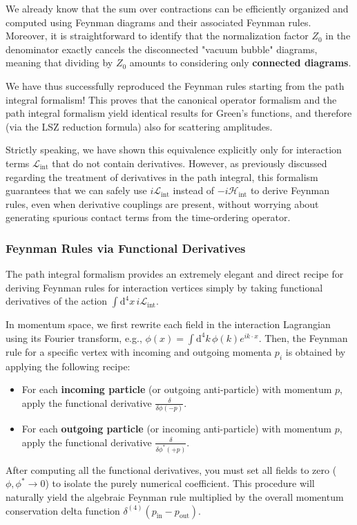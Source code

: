 We already know that the sum over contractions can be efficiently organized and computed using Feynman diagrams and their associated Feynman rules. Moreover, it is straightforward to identify that the normalization factor $Z_0$ in the denominator exactly cancels the disconnected "vacuum bubble" diagrams, meaning that dividing by $Z_0$ amounts to considering only \textbf{connected diagrams}.

We have thus successfully reproduced the Feynman rules starting from the path integral formalism! This proves that the canonical operator formalism and the path integral formalism yield identical results for Green's functions, and therefore (via the LSZ reduction formula) also for scattering amplitudes.

\begin{remark}
    Strictly speaking, we have shown this equivalence explicitly only for interaction terms $\mathcal{L}_{\text{int}}$ that do not contain derivatives. However, as previously discussed regarding the treatment of derivatives in the path integral, this formalism guarantees that we can safely use $i\mathcal{L}_{\text{int}}$ instead of $-i\mathcal{H}_{\text{int}}$ to derive Feynman rules, even when derivative couplings are present, without worrying about generating spurious contact terms from the time-ordering operator.
\end{remark}

\subsubsection{Feynman Rules via Functional Derivatives}

The path integral formalism provides an extremely elegant and direct recipe for deriving Feynman rules for interaction vertices simply by taking functional derivatives of the action $\int \mathrm{d}^4x \, i \mathcal{L}_{\text{int}}$.

In momentum space, we first rewrite each field in the interaction Lagrangian using its Fourier transform, e.g., $\phi(x) = \int \mathrm{d}^4k \, \phi(k) e^{ik \cdot x}$.
Then, the Feynman rule for a specific vertex with incoming and outgoing momenta $p_i$ is obtained by applying the following recipe:
\begin{itemize}
    \item For each \textbf{incoming particle} (or outgoing anti-particle) with momentum $p$, apply the functional derivative $\frac{\delta}{\delta \phi(-p)}$.
    \item For each \textbf{outgoing particle} (or incoming anti-particle) with momentum $p$, apply the functional derivative $\frac{\delta}{\delta \phi^*(+p)}$.
\end{itemize}
After computing all the functional derivatives, you must set all fields to zero ($\phi, \phi^* \to 0$) to isolate the purely numerical coefficient. This procedure will naturally yield the algebraic Feynman rule multiplied by the overall momentum conservation delta function $\delta^{(4)}(p_{\text{in}} - p_{\text{out}})$.

